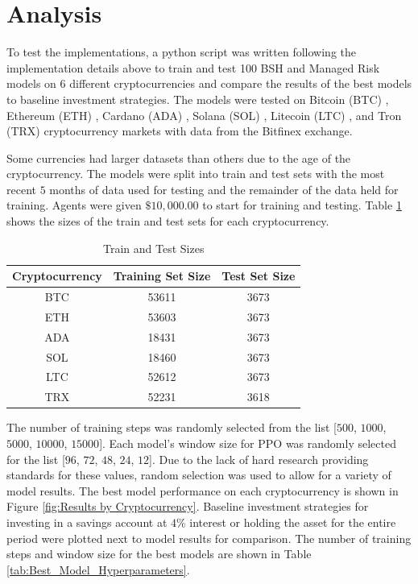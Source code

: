 \documentclass[journal]{new-aiaa}
\begin{document}
\section{Analysis}\label{sec:Analysis}
To test the implementations, a python script was written following the implementation details above to train and test 100 BSH and Managed Risk models on 6 different cryptocurrencies and compare the results of the best models to baseline investment strategies.
The models were tested on Bitcoin (BTC) \cite{nakamoto2008bitcoin}, Ethereum (ETH) \cite{buterin2013ethereum}, 
Cardano (ADA) \cite{cardano2024}, Solana (SOL) \cite{yakovenko2017solana}, Litecoin (LTC) \cite{lee2011litecoin}, and Tron (TRX) \cite{sun2017tron} cryptocurrency markets with data from the Bitfinex exchange.

Some currencies had larger datasets than others due to the age of the cryptocurrency.
The models were split into train and test sets with the most recent $5$ months of data used for testing and the remainder of the data held for training.
Agents were given $\$10,000.00$ to start for training and testing.
Table \ref{tab:Train_and_Test_Sizes} shows the sizes of the train and test sets for each cryptocurrency.

\begin{table}[hbt!]
        \centering
        \begin{tabular}{||c|c|c||}
                \hline
                \textbf{Cryptocurrency} & \textbf{Training Set Size} & \textbf{Test Set Size} \\
                \hline
                \hline
                BTC & 53611 & 3673 \\
                \hline
                ETH & 53603 & 3673 \\
                \hline
                ADA & 18431 & 3673 \\
                \hline
                SOL & 18460 & 3673 \\
                \hline
                LTC & 52612 & 3673 \\
                \hline
                TRX & 52231 & 3618 \\
                \hline
        \end{tabular}
        \caption{Train and Test Sizes}
        \label{tab:Train_and_Test_Sizes}
\end{table}

The number of training steps was randomly selected from the list [$500$, $1000$, $5000$, $10000$, $15000$].
Each model's window size for PPO was randomly selected for the list [$96$, $72$, $48$, $24$, $12$].
Due to the lack of hard research providing standards for these values, random selection was used to allow for a variety of model results.
The best model performance on each cryptocurrency is shown in Figure \ref{fig:Results by Cryptocurrency}. 
Baseline investment strategies for investing in a savings account at $4\%$ interest or holding the asset for the entire period were plotted next to model results for comparison.
The number of training steps and window size for the best models are shown in Table \ref{tab:Best_Model_Hyperparameters}.
\end{document}
